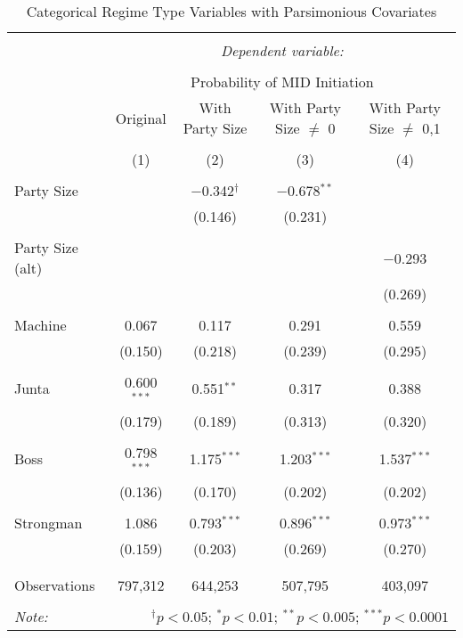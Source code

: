 
\begin{table}[!htbp] \centering 
  \caption{Categorical Regime Type Variables with Parsimonious Covariates} 
  \label{} 
\begin{tabular}{@{\extracolsep{5pt}}lcccc} 
\\[-1.8ex]\hline 
\hline \\[-1.8ex] 
 & \multicolumn{4}{c}{\textit{Dependent variable:}} \\ 
\cline{2-5} 
\\[-1.8ex] & \multicolumn{4}{c}{Probability of MID Initiation} \\ 
 & Original & With Party Size & With Party Size ${\neq}$ 0 & With Party Size ${\neq}$ {0,1} \\ 
\\[-1.8ex] & (1) & (2) & (3) & (4)\\ 
\hline \\[-1.8ex] 
 Party Size &  & $-$0.342$^{\dagger}$ & $-$0.678$^{**}$ &  \\ 
  &  & (0.146) & (0.231) &  \\ 
  & & & & \\ 
 Party Size (alt) &  &  &  & $-$0.293 \\ 
  &  &  &  & (0.269) \\ 
  & & & & \\ 
 Machine & 0.067 & 0.117 & 0.291 & 0.559 \\ 
  & (0.150) & (0.218) & (0.239) & (0.295) \\ 
  & & & & \\ 
 Junta & 0.600$^{***}$ & 0.551$^{**}$ & 0.317 & 0.388 \\ 
  & (0.179) & (0.189) & (0.313) & (0.320) \\ 
  & & & & \\ 
 Boss & 0.798$^{***}$ & 1.175$^{***}$ & 1.203$^{***}$ & 1.537$^{***}$ \\ 
  & (0.136) & (0.170) & (0.202) & (0.202) \\ 
  & & & & \\ 
 Strongman & 1.086 & 0.793$^{***}$ & 0.896$^{***}$ & 0.973$^{***}$ \\ 
  & (0.159) & (0.203) & (0.269) & (0.270) \\ 
  & & & & \\ 
\hline \\[-1.8ex] 
Observations & 797,312 & 644,253 & 507,795 & 403,097 \\ 
\hline 
\hline \\[-1.8ex] 
\textit{Note:}   & \multicolumn{4}{r}{$^{\dagger} p<0.05$; $^{*} p<0.01$; $^{**} p<0.005$; $^{***} p<0.0001$} \\ 
\end{tabular} 
\end{table} 
